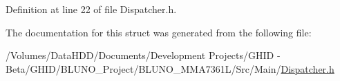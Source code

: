 \-Definition at line 22 of file \-Dispatcher.\-h.



\-The documentation for this struct was generated from the following file\-:\begin{DoxyCompactItemize}
\item 
/\-Volumes/\-Data\-H\-D\-D/\-Documents/\-Development Projects/\-G\-H\-I\-D -\/ Beta/\-G\-H\-I\-D/\-B\-L\-U\-N\-O\-\_\-\-Project/\-B\-L\-U\-N\-O\-\_\-\-M\-M\-A7361\-L/\-Src/\-Main/\hyperlink{_dispatcher_8h}{\-Dispatcher.\-h}\end{DoxyCompactItemize}
